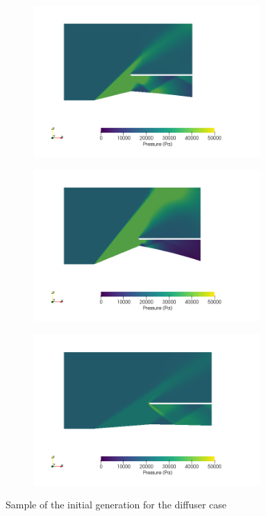 \begin{figure}[h!]
    \centering
    \begin{subfigure}[t]{0.31\textwidth}
        \includegraphics[width=0.95\textwidth, height=0.18\textheight]{Figures/4/SCpg0i3.png}
    \end{subfigure}
    \begin{subfigure}[t]{0.31\textwidth}
        \includegraphics[width=0.95\textwidth, height=0.18\textheight]{Figures/4/SCpg0i9.png}
    \end{subfigure}
    \begin{subfigure}[t]{0.31\textwidth}
        \includegraphics[width=0.95\textwidth, height=0.18\textheight]{Figures/4/SCpg0i46.png}
    \end{subfigure}
    \caption{Sample of the initial generation for the diffuser case}
            \label{fig:initialDif}
\end{figure}

